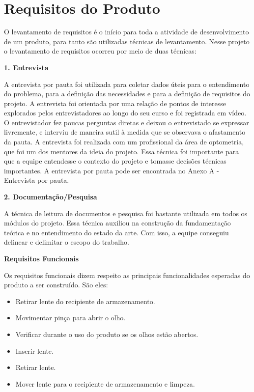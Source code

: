 \chapter[Requisitos do Produto]{Requisitos do Produto}

O levantamento de requisitos é o início para toda a atividade de desenvolvimento de um produto, para tanto são utilizadas técnicas de levantamento. Nesse projeto o levantamento de requisitos ocorreu por meio de duas técnicas:

\textbf{1. Entrevista}

A entrevista por pauta foi utilizada para coletar dados úteis para o entendimento do problema, para a definição das necessidades e para a definição de requisitos do projeto. A entrevista foi orientada por uma relação de pontos de interesse explorados pelos entrevistadores ao longo do seu curso e foi registrada em vídeo. O entrevistador fez poucas perguntas diretas e deixou o entrevistado se expressar livremente, e interviu de maneira sutil à medida que se observava o afastamento da pauta. A entrevista foi realizada com um profissional da área de optometria, que foi um dos mentores da ideia do projeto. Essa técnica foi importante para que a equipe entendesse o contexto do projeto e tomasse decisões técnicas importantes. A entrevista por pauta pode ser encontrada no Anexo A - Entrevista por pauta.

\textbf{2. Documentação/Pesquisa}

A técnica de leitura de documentos e pesquisa foi bastante utilizada em todos os módulos do projeto. Essa técnica auxiliou na construção da fundamentação teórica e no entendimento do estado da arte. Com isso, a equipe conseguiu delinear e delimitar o escopo do trabalho.

\textbf{Requisitos Funcionais}

Os requisitos funcionais dizem respeito as principais funcionalidades esperadas do produto a ser construído. São eles:

\begin{itemize}
\item Retirar lente do recipiente de armazenamento.
\item Movimentar pinça para abrir o olho.
\item Verificar durante o uso do produto se os olhos estão abertos.
\item Inserir lente.
\item Retirar lente.
\item Mover lente para o recipiente de armazenamento e limpeza.
\end{itemize}

